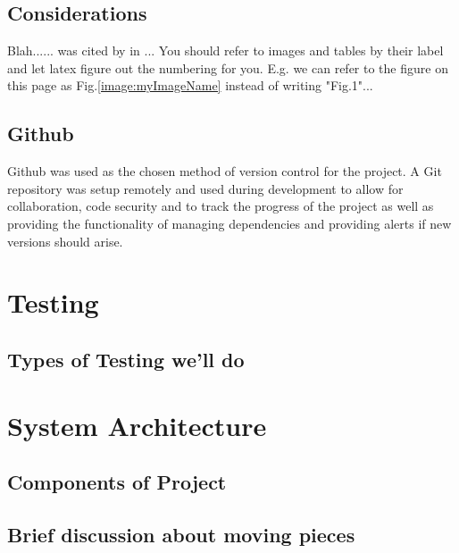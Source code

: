 \subsection{Considerations}
Blah...... was cited by \cite{MEAN_STACK} in ... You should refer to images and tables by their label and let latex figure out the numbering for you. E.g. we can refer to the figure on this page as Fig.\ref{image:myImageName} instead of writing "Fig.1"...

\subsection{Github}

Github was used as the chosen method of version control for the project. A Git repository was setup remotely and used during development to allow for collaboration, code security and to track the progress of the project as well as providing the functionality of managing dependencies and providing alerts if new versions should arise. 




\section{Testing}
\subsection{Types of Testing we'll do}

\section{System Architecture}
\subsection{Components of Project}
\subsection{Brief discussion about moving pieces}


